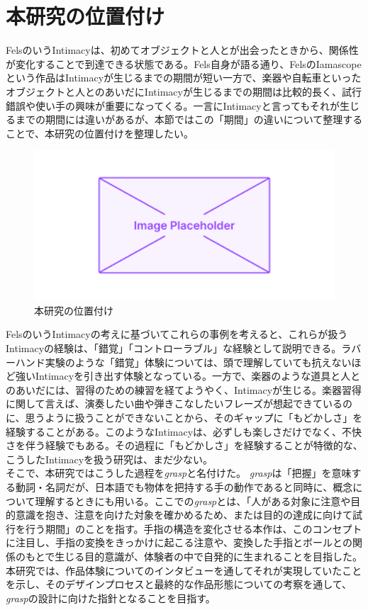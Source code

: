 \section{本研究の位置付け}
FelsのいうIntimacyは、初めてオブジェクトと人とが出会ったときから、関係性が変化することで到達できる状態である。Fels自身が語る通り、FelsのIamascopeという作品はIntimacyが生じるまでの期間が短い一方で、楽器や自転車といったオブジェクトと人とのあいだにIntimacyが生じるまでの期間は比較的長く、試行錯誤や使い手の興味が重要になってくる。一言にIntimacyと言ってもそれが生じるまでの期間には違いがあるが、本節ではこの「期間」の違いについて整理することで、本研究の位置付けを整理したい。

\begin{figure}[H]
  \centering
  \includegraphics[width=15cm]{img/placeholder.png}
  \caption{本研究の位置付け}
  \label{fig:position}
\end{figure}

FelsのいうIntimacyの考えに基づいてこれらの事例を考えると、これらが扱うIntimacyの経験は、「錯覚」「コントローラブル」な経験として説明できる。ラバーハンド実験のような「錯覚」体験については、頭で理解していても抗えないほど強いIntimacyを引き出す体験となっている。一方で、楽器のような道具と人とのあいだには、習得のための練習を経てようやく、Intimacyが生じる。楽器習得に関して言えば、演奏したい曲や弾きこなしたいフレーズが想起できているのに、思うように扱うことができないことから、そのギャップに「もどかしさ」を経験することがある。このようなIntimacyは、必ずしも楽しさだけでなく、不快さを伴う経験でもある。その過程に「もどかしさ」を経験することが特徴的な、こうしたIntimacyを扱う研究は、まだ少ない。\\
そこで、本研究ではこうした過程を\textit{grasp}と名付けた。
\textit{grasp}は「把握」を意味する動詞・名詞だが、日本語でも物体を把持する手の動作であると同時に、概念について理解するときにも用いる。ここでの\textit{grasp}とは、「人がある対象に注意や目的意識を抱き、注意を向けた対象を確かめるため、または目的の達成に向けて試行を行う期間」のことを指す。手指の構造を変化させる本作は、このコンセプトに注目し、手指の変換をきっかけに起こる注意や、変換した手指とボールとの関係のもとで生じる目的意識が、体験者の中で自発的に生まれることを目指した。
本研究では、作品体験についてのインタビューを通してそれが実現していたことを示し、そのデザインプロセスと最終的な作品形態についての考察を通して、\textit{grasp}の設計に向けた指針となることを目指す。

